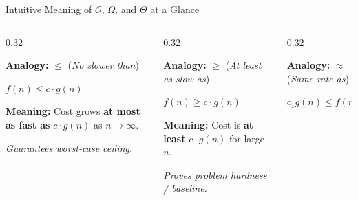 \documentclass[aspectratio=169]{beamer}
\begin{document}
\begin{frame}{Intuitive Meaning of $\mathcal{O}$, $\Omega$, and $\Theta$ at a Glance}
  \begin{columns}[T]
    \begin{column}{0.32\textwidth}
      \begin{tcolorbox}[colframe=blue!70!black,colback=SoftBlue!35,title={\centering\bfseries $\mathcal{O}(g(n))$: Upper Bound},arc=1.5mm]
        \scriptsize
        \textbf{Analogy:} $\le$ (\textit{No slower than})
        \vspace{0.3em}
        
        $f(n) \le c \cdot g(n)$
        \vspace{0.3em}
        
        \textbf{Meaning:} Cost grows \textbf{at most as fast as} $c \cdot g(n)$ as $n \to \infty$.
        \vspace{0.3em}
        
        \textit{Guarantees worst-case ceiling.}
      \end{tcolorbox}
    \end{column}
    \begin{column}{0.32\textwidth}
      \begin{tcolorbox}[colframe=orange!85!black,colback=SoftOrange!35,title={\centering\bfseries $\Omega(g(n))$: Lower Bound},arc=1.5mm]
        \scriptsize
        \textbf{Analogy:} $\ge$ (\textit{At least as slow as})
        \vspace{0.3em}
        
        $f(n) \ge c \cdot g(n)$
        \vspace{0.3em}
        
        \textbf{Meaning:} Cost is \textbf{at least} $c \cdot g(n)$ for large $n$.
        \vspace{0.3em}
        
        \textit{Proves problem hardness / baseline.}
      \end{tcolorbox}
    \end{column}
    \begin{column}{0.32\textwidth}
      \begin{tcolorbox}[colframe=ForestGreen,colback=SoftGreen!35,title={\centering\bfseries $\Theta(g(n))$: Tight Bound},arc=1.5mm]
        \scriptsize
        \textbf{Analogy:} $\approx$ (\textit{Same rate as})
        \vspace{0.3em}
        
        $c_1 g(n) \le f(n) \le c_2 g(n)$
        \vspace{0.3em}
        

\end{tcolorbox}
\end{column}
\end{columns}
\end{frame}
\end{document}
